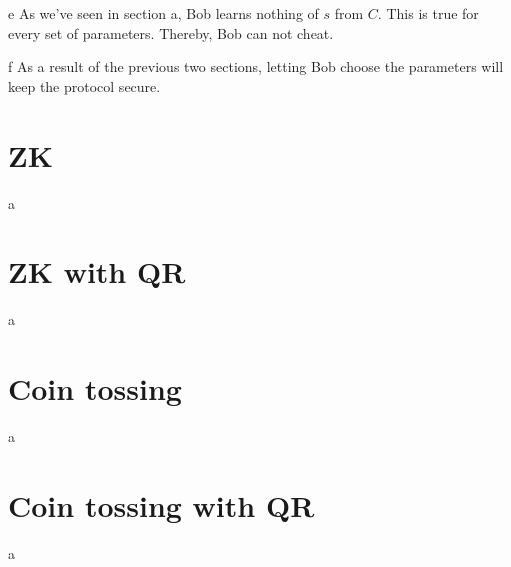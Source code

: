 \documentclass{article}
\begin{document}
\begin{paragraph}
    e As we've seen in section a, Bob learns nothing of $s$ from $C$. This is true for every set of parameters. Thereby, Bob
    can not cheat.
\end{paragraph}

\begin{paragraph}
    f As a result of the previous two sections, letting Bob choose the parameters will keep the protocol secure.
\end{paragraph}

\section{ZK}
\begin{paragraph}
    a 
\end{paragraph}

\section{ZK with QR}
\begin{paragraph}
    a 
\end{paragraph}

\section{Coin tossing}
\begin{paragraph}
    a 
\end{paragraph}

\section{Coin tossing with QR}
\begin{paragraph}
    a 
\end{paragraph}
\end{document}
